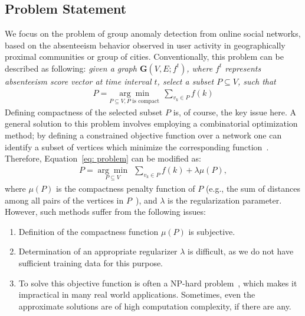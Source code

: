 \subsection{Problem Statement}
\label{sec:problemformulation}
We focus on the problem of group anomaly detection from online social networks, based on the absenteeism behavior observed in user activity in geographically proximal communities or group of cities.
Conventionally, this problem can be described as following: \emph{given a graph $\mathbf{G}(V,E;f^t)$, where $f^t$ represents \textit{absenteeism score} vector at time interval $t$, select a subset $P \subseteq V$, such that
\begin{eqnarray}
 \label{eq: problem}
    P=\underset{P\subseteq V, P \mbox{ is compact}}{\arg\min}\ \ \sum_{v_k\in P} {f(k)}
\end{eqnarray} }
Defining compactness of the selected subset $P$ is, of course, the key issue here.
A general solution to this problem involves employing a combinatorial optimization method; by defining a constrained objective function over a network one can identify a subset of vertices which minimize the corresponding function~\cite{rozenshtein2014event}. Therefore, Equation~\ref{eq: problem} can be modified as:
\begin{eqnarray}
 \label{eq: problem_conventional}
    P=\underset{P\subseteq V}{\arg\min}\ \ \sum_{v_k\in P} {f(k)}+\lambda \mu(P),
\end{eqnarray}
where $\mu(P)$ is the compactness penalty function of $P$ (e.g., the sum of distances among
all pairs of the vertices in $P$~\cite{rozenshtein2014event}), and $\lambda$ is the regularization parameter.
However, such methods suffer from the following issues:
\begin{enumerate}
\item Definition of the compactness function $\mu(P)$ is subjective.
\item  Determination of an appropriate regularizer $\lambda$ is difficult, as we do not have sufficient training data for this purpose.
\item To solve this objective function is often a NP-hard problem~\cite{rozenshtein2014event}, which makes it impractical in many real world applications. Sometimes, even the approximate solutions are of high computation complexity, if there are any.
\end{enumerate}

